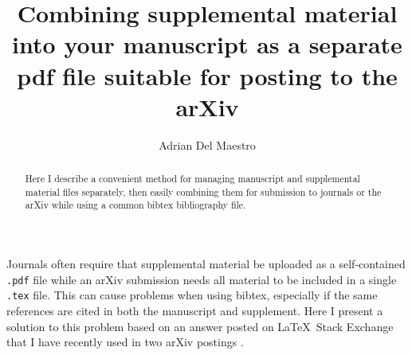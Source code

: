 \documentclass[10pt,twocolumn,prl,aps,floatfix,superscriptaddress,longbibliography]{revtex4-1}
\begin{document}
\title{Combining supplemental material into your manuscript as a separate pdf
file suitable for posting to the arXiv}

\author{Adrian Del Maestro}

\begin{abstract}
    Here I describe a convenient method for managing manuscript and supplemental
    material files separately, then easily combining them for submission to
    journals or the arXiv while using a common bibtex bibliography file.
\end{abstract}
\maketitle

Journals often require that supplemental material be uploaded as a
self-contained \texttt{.pdf} file while an arXiv submission needs all material to be
included in a single \texttt{.tex} file.  This can cause problems when using
bibtex, especially if the same references are cited in both the manuscript and supplement.
Here I present a solution to this problem based on an answer posted on
\LaTeX~Stack Exchange \cite{tex} that I have recently used in two arXiv
postings \cite{Sengupta:2018pv, Barghathi:2018cu}.
\end{document}
